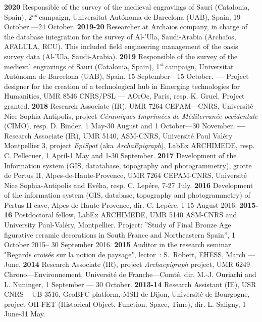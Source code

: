 \documentclass[11pt]{report} %
\begin{document}
\textbf{2020 }Responsible of the survey of the medieval engravings of Sauri (Catalonia, Spain), 2${}^{nd\ }$campaign, Universitat Aut\'{o}noma de Barcelona (UAB), Spain, 19 October ---24 October.\textbf{}
\smallbreak
\textbf{2019-20 }Researcher at Archa\"{i}os company, in charge of the database integration for the survey of Al-'Ula, Saudi-Arabia (Archa\"{i}os, AFALULA, RCU). This included field engineering management of the oasis survey data (Al-'Ula, Saudi-Arabia).
\smallbreak
\textbf{2019 }Responsible of the survey of the medieval engravings of Sauri (Catalonia, Spain), 1${}^{st\ }$campaign, Universitat Aut\'{o}noma de Barcelona (UAB), Spain, 15 September---15 October.\textbf{}
\smallbreak
\textbf{---  }Project designer for the creation of a technological hub in Emerging technologies for Humanities, UMR 8546 CNRS/PSL --- AOrOc, Paris, resp. K. Gruel. Project granted.
\smallbreak
\textbf{2018 }Research Associate (IR), UMR 7264 CEPAM---CNRS, Universit\'{e} Nice Sophia-Antipolis, project \textit{C\'{e}ramiques Imprim\'{e}es de M\'{e}diterran\'{e}e occidentale} (CIMO), resp. D. Binder, 1 May-30 August and 1 October---30 November.
\smallbreak
\textbf{---  }Research Associate (IR), UMR 5140, ASM-CNRS, Universit\'{e} Paul Val\'{e}ry Montpellier 3, project \textit{EpiSpat} (aka \textit{ArchaEpigraph}), LabEx ARCHIMEDE, resp. C. Pellecuer, 1 April-1 May and 1-30 September.
\smallbreak
\textbf{2017 } Development of the Information system (GIS, datatabase, topography and photogrammetry), grotte de Pertus II, Alpes-de-Haute-Provence, UMR 7264 CEPAM-CNRS, Universit\'{e} Nice Sophia-Antipolis and Ev\'{e}ha, resp. C. Lep\'{e}re, 7-27 July.
\smallbreak
\textbf{2016 } Development of the information system (GIS, database, topography and photogrammetry) of Pertus II cave, Alpes-de-Haute-Provence, dir. C. Lep\'{e}re, 1-15 August 2016.
\smallbreak
\textbf{2015-16  }Postdoctoral fellow, LabEx ARCHIMEDE, UMR 5140 ASM-CNRS and University Paul-Val\'{e}ry, Montpellier. Project: ''Study of Final Bronze Age figurative ceramic decorations in South France and Northeastern Spain'', 1 October 2015-- 30 September 2016.
\smallbreak
\textbf{2015 }Auditor in the research seminar "Regards crois\'{e}s sur la notion de paysage", lector~: S.~Robert, EHESS, March --- June.\textbf{}
\smallbreak
\textbf{2014  }Research\textbf{ }Associate (IR), project \textit{Archaepigraph} project, UMR 6249 Chrono---Environnement, Universit\'{e} de Franche---Comt\'{e}, dir. M.-J. Ouriachi and L. Nuninger, 1 September --- 30 October.
\smallbreak
\textbf{2013-14  }Research Assistant (IE), USR CNRS -- UB 3516, GeoBFC platform, MSH de Dijon, Universit\'{e} de Bourgogne, project OH-FET (Historical Object, Function, Space, Time), dir. L. Saligny, 1 June-31 May.
\end{document}
